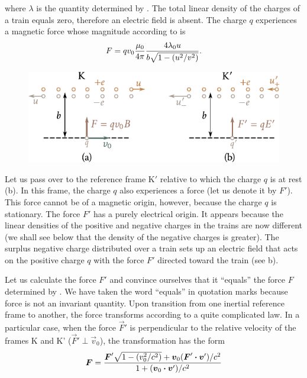 \noindent
where $\lambda$ is the quantity determined by . The total linear density of the charges of a train equals zero, therefore an electric field is absent. The charge $q$ experiences a magnetic force whose magnitude according to  is
\begin{equation}\label{eq:6_51}
    F = q v_0 \frac{\mu_0}{4\pi} \frac{4 \lambda_0 u}{b \sqrt{1 - \left(u^2/v^2\right)}}.
\end{equation}

\begin{figure}[t]
	\begin{center}
		\includegraphics[scale=1]{figures/ch_06/fig_6_13.pdf}
		\caption[]{}
		\label{fig:6_13}
	\end{center}
	\vspace{-0.8cm}
\end{figure}

Let us pass over to the reference frame K$'$ relative to which the charge $q$ is at rest (b). In this frame, the charge $q$ also experiences a force (let us denote it by $F'$). This force cannot be of a magnetic origin, however, because the charge $q$ is stationary. The force $F'$ has a purely electrical origin. It appears because the linear densities of the positive and negative charges in the trains are now different (we shall see below that the density of the negative charges is greater). The surplus negative charge distributed over a train sets up an electric field that acts on the positive charge $q$ with the force $F'$ directed toward the train (see b).

Let us calculate the force $F'$ and convince ourselves that it ``equals'' the force $F$ determined by . We have taken the word ``equals'' in quotation marks because force is not an invariant quantity. Upon transition from one inertial reference frame to another, the force transforms according to a quite complicated law. In a particular case, when the force $\vec{F}'$ is perpendicular to the relative velocity of the frames K and K' ($\vec{F}' \perp \vec{v}_0$), the transformation has the form
\begin{equation*}
    \boldsymbol{F} = \frac{\boldsymbol{F}' \sqrt{1 - \left(v_0^2/c^2\right)} + \boldsymbol{v}_0 (\boldsymbol{F}'\boldsymbol{\cdot}\boldsymbol{v}')/c^2}{1 + (\boldsymbol{v}_0\boldsymbol{\cdot}\boldsymbol{v}')/c^2}
\end{equation*}

